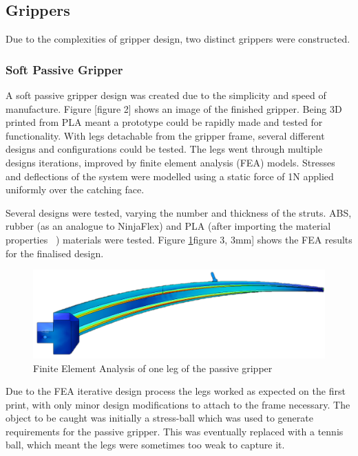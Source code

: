 \documentclass[conference]{IEEEtran}
\begin{document}
\subsection{Grippers}
Due to the complexities of gripper design, two distinct grippers were constructed.
\subsubsection{Soft Passive Gripper}
A soft passive gripper design was created due to the simplicity and speed of manufacture. Figure [figure 2] shows an image of the finished gripper.
Being 3D printed from PLA meant a prototype could be rapidly made and tested for functionality. With legs detachable from the gripper frame, several different designs and configurations could be tested. The legs went through multiple designs iterations, improved by finite element analysis (FEA) models. Stresses and deflections of the system were modelled using a static force of 1N applied uniformly over the catching face.

Several designs were tested, varying the number and thickness of the struts. ABS, rubber (as an analogue to NinjaFlex) and PLA (after importing the material properties ~\cite{CRF3:CRF3126}) materials were tested. Figure \ref{fea1}figure 3, 3mm] shows the FEA results for the finalised design.

\begin{figure}\label{fea1}
	\centering
	\includegraphics[scale=0.15]{fea1.png}
	\caption{Finite Element Analysis of one leg of the passive gripper}
\end{figure}

Due to the FEA iterative design process the legs worked as expected on the first print, with only minor design modifications to attach to the frame necessary. The object to be caught was initially a stress-ball which was used to generate requirements for the passive gripper. This was eventually replaced with a tennis ball, which meant the legs were sometimes too weak to capture it. 
\end{document}
